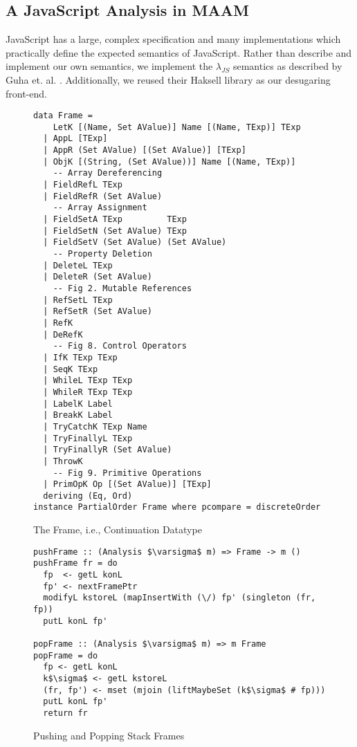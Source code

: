 \documentclass[10pt,letter,english]{article}
\newcommand{\js}[0]{JavaScript}
\newcommand{\lambdajs}[0]{$\lambda_{JS}$}
\begin{document}
\subsection{A JavaScript Analysis in MAAM}

\js{} has a large, complex specification and many implementations which
practically define the expected semantics of \js{}. Rather than describe and
implement our own semantics, we implement the \lambdajs{} semantics as described
by Guha et. al. \cite{lambdajs}. Additionally, we reused their Haksell library
as our desugaring front-end.

\begin{figure}
\centering

\begin{lstlisting}
data Frame =
    LetK [(Name, Set AValue)] Name [(Name, TExp)] TExp
  | AppL [TExp]
  | AppR (Set AValue) [(Set AValue)] [TExp]
  | ObjK [(String, (Set AValue))] Name [(Name, TExp)]
    -- Array Dereferencing
  | FieldRefL TExp
  | FieldRefR (Set AValue)
    -- Array Assignment
  | FieldSetA TExp         TExp
  | FieldSetN (Set AValue) TExp
  | FieldSetV (Set AValue) (Set AValue)
    -- Property Deletion
  | DeleteL TExp
  | DeleteR (Set AValue)
    -- Fig 2. Mutable References
  | RefSetL TExp
  | RefSetR (Set AValue)
  | RefK
  | DeRefK
    -- Fig 8. Control Operators
  | IfK TExp TExp
  | SeqK TExp
  | WhileL TExp TExp
  | WhileR TExp TExp
  | LabelK Label
  | BreakK Label
  | TryCatchK TExp Name
  | TryFinallyL TExp
  | TryFinallyR (Set AValue)
  | ThrowK
    -- Fig 9. Primitive Operations
  | PrimOpK Op [(Set AValue)] [TExp]
  deriving (Eq, Ord)
instance PartialOrder Frame where pcompare = discreteOrder
\end{lstlisting}
\caption{The Frame, i.e., Continuation Datatype}
\end{figure}

\begin{figure}
\centering

\begin{lstlisting}
pushFrame :: (Analysis $\varsigma$ m) => Frame -> m ()
pushFrame fr = do
  fp  <- getL konL
  fp' <- nextFramePtr
  modifyL kstoreL (mapInsertWith (\/) fp' (singleton (fr, fp))
  putL konL fp'

popFrame :: (Analysis $\varsigma$ m) => m Frame
popFrame = do
  fp <- getL konL
  k$\sigma$ <- getL kstoreL
  (fr, fp') <- mset (mjoin (liftMaybeSet (k$\sigma$ # fp)))
  putL konL fp'
  return fr
\end{lstlisting}
\caption{Pushing and Popping Stack Frames}
\end{figure}
\end{document}
